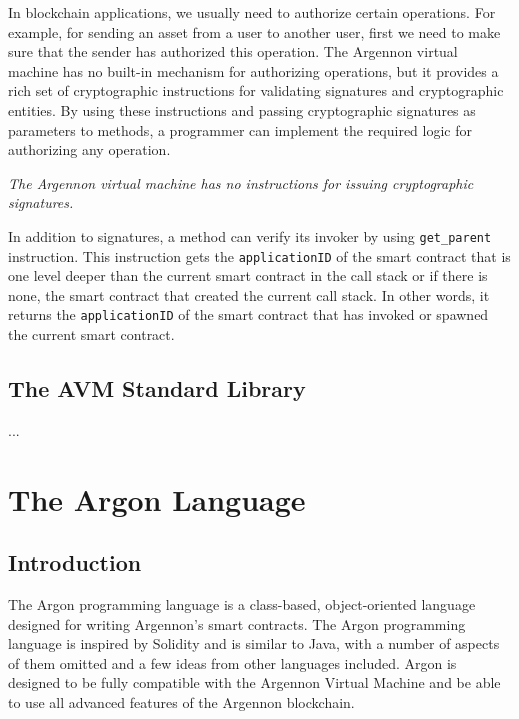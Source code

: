 \documentclass[11pt, a4paper]{report}
\newcommand{\note}[1] {
    \begin{tcolorbox}[colframe=white,colback=white]
        \emph{#1}
    \end{tcolorbox}
}
\begin{document}
    In blockchain applications, we usually need to authorize certain operations. For example, for sending an asset
    from a user to another user, first we need to make sure that the sender has authorized this operation. The
    Argennon virtual machine has no built-in mechanism for authorizing operations, but it provides a rich set of
    cryptographic instructions for validating signatures and cryptographic entities. By using these instructions and
    passing cryptographic signatures as parameters to methods, a programmer can implement the required logic
    for authorizing any operation.

    \note{The Argennon virtual machine has no instructions for issuing cryptographic signatures.}

    In addition to signatures, a method can verify its invoker by using \texttt{get\_parent} instruction. This
    instruction gets the \texttt{applicationID} of the smart contract that is one level deeper than the current
    smart contract in the call stack or if there is none, the smart contract that created the current call stack.
    In other words, it returns the \texttt{applicationID} of the smart contract that has invoked or spawned
    the current smart contract.


    \section{The AVM Standard Library}\label{sec:the-avm-standard-library}

    ...

    \chapter{The Argon Language}\label{ch:argon-lang}

    \section{Introduction}\label{sec:introduction2}

    The Argon programming language is a class-based, object-oriented language designed for writing Argennon's smart
    contracts. The Argon programming language is inspired by Solidity and is similar to Java, with a number of aspects
    of them omitted and a few ideas from other languages included. Argon is designed to be fully compatible with
    the Argennon Virtual Machine and be able to use all advanced features of the Argennon blockchain.
\end{document}
